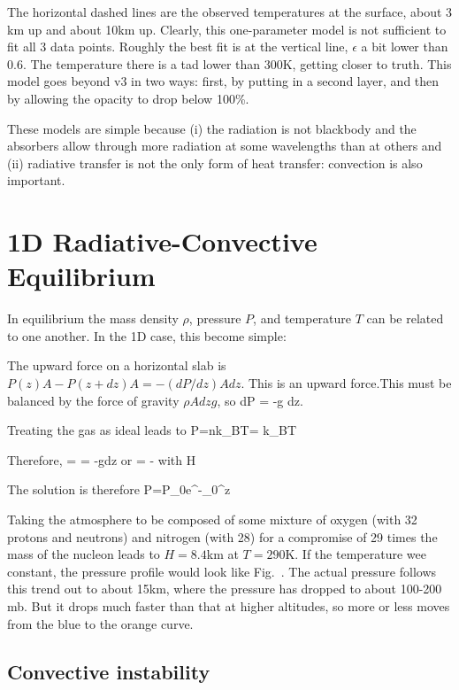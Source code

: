 \documentclass[11pt]{book}
\begin{document}
The horizontal dashed lines are the observed temperatures at the surface, about 3 km up and about 10km up. Clearly, this one-parameter model is not sufficient to fit all 3 data points. Roughly the best fit is at the vertical line, $\epsilon$ a bit lower than 0.6. The temperature there is a tad lower than 300K, getting closer to truth. This model goes beyond v3 in two ways: first, by putting in a second layer, and then by allowing the opacity to drop below 100\%. 

These models are simple because (i) the radiation is not blackbody and the absorbers allow through more radiation at some wavelengths than at others and (ii) radiative transfer is not the only form of heat transfer: convection is also important. 

\section{1D Radiative-Convective Equilibrium}

In equilibrium the mass density $\rho$, pressure $P$, and temperature $T$ can be related to one another. In the 1D case, this become simple:
\bei
\item The upward force on a horizontal slab is $P(z)A-P(z+dz)A=-(dP/dz)A dz$. This is an upward force.This must be balanced by the force of gravity $\rho Adz g$, so
\be
dP = -\rho g dz.
\ee
\item Treating the gas as ideal leads to
\be
P=nk_BT= k_BT\ee
\item Therefore,
\be
{} =  = -gdz\ee
or\be
{} = -
\ee
with \be
H\equiv {}\ee
\item The solution is therefore
\be
P=P_0e^{-\int_0^z }
\ee
\eei

Taking the atmosphere to be composed of some mixture of oxygen (with 32 protons and neutrons) and nitrogen (with 28) for a compromise of 29 times the mass of the nucleon leads to $H=8.4$km at $T=290$K. If the temperature wee constant, the pressure profile would look like Fig.~.
The actual pressure follows this trend out to about 15km, where the pressure has dropped to about 100-200 mb. But it drops much faster than that at higher altitudes, so more or less moves from the blue to the orange curve.

\subsection{Convective instability}
\end{document}
